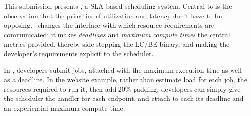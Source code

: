 This submission presents \textit{\sysname}, a SLA-based scheduling system.
Central to \sysname{} is the observation that the priorities of utilization and
latency don't have to be opposing.\ \sysname{} changes the interface with which
resource requirements are communicated: it makes \textit{deadlines} and
\textit{maximum compute times} the central metrics provided, thereby
side-stepping the LC/BE binary, and making the developer's requirements explicit
to the scheduler.

In \sysname{}, developers submit jobs, attached with the maximum execution time
as well as a deadline. In the website example, rather than estimate load for
each job, the resources required to run it, then add 20\% padding, developers
can simply give the scheduler the handler for each endpoint, and attach to each
its deadline and an experiential maximum compute time.